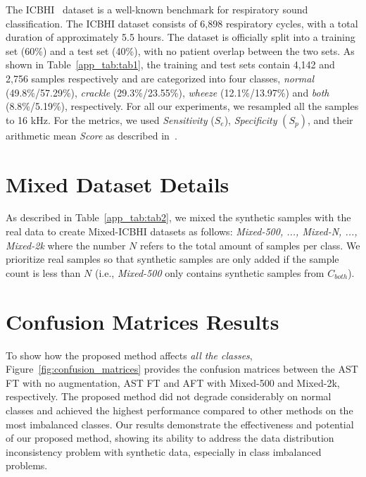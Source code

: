 \documentclass{article}
\begin{document}
 The ICBHI~\cite{rocha2018alpha} dataset is a well-known benchmark for respiratory sound classification. The ICBHI dataset consists of 6,898 respiratory cycles, with a total duration of approximately 5.5 hours. The dataset is officially split into a training set (60\%) and a test set (40\%), with no patient overlap between the two sets. As shown in Table~\ref{app_tab:tab1}, the training and test sets contain 4,142 and 2,756 samples respectively and are categorized into four classes, \emph{normal} (49.8\%/57.29\%), \emph{crackle} (29.3\%/23.55\%), \emph{wheeze} (12.1\%/13.97\%) and \emph{both} (8.8\%/5.19\%), respectively. For all our experiments, we resampled all the samples to 16 kHz. For the metrics, we used \textit{Sensitivity} ($S_{e}$), \textit{Specificity} $(S_{p})$, and their arithmetic mean \textit{Score} as described in~\cite{rocha2018alpha}.



\section{Mixed Dataset Details}
\label{appendix_mixed_dataset}
As described in Table~\ref{app_tab:tab2}, we mixed the synthetic samples with the real data to create Mixed-ICBHI datasets as follows: \emph{Mixed-500, ..., Mixed-N, ..., Mixed-2k} where the number $N$ refers to the total amount of samples per class. We prioritize real samples so that synthetic samples are only added if the sample count is less than $N$ (i.e., \emph{Mixed-500} only contains synthetic samples from $C_{both}$).

\section{Confusion Matrices Results}
\label{appendix_confusion}
To show how the proposed method affects \emph{all the classes}, Figure~\ref{fig:confusion_matrices} provides the confusion matrices between the AST FT with no augmentation, AST FT and AFT with Mixed-500 and Mixed-2k, respectively. The proposed method did not degrade considerably on normal classes and achieved the highest performance compared to other methods on the most imbalanced classes. Our results demonstrate the effectiveness and potential of our proposed method, showing its ability to address the data distribution inconsistency problem with synthetic data, especially in class imbalanced problems.
\end{document}
